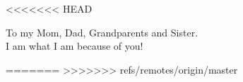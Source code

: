 %
\begin{frontmatter}

%
%
\makefrontmatter

%
%
%
%
%
%
<<<<<<< HEAD
\begin{dedication}
To my Mom, Dad, Grandparents and Sister.\\ I am what I am because of you!
\end{dedication}
=======
>>>>>>> refs/remotes/origin/master


%
%



%
%

%



\end{frontmatter}
